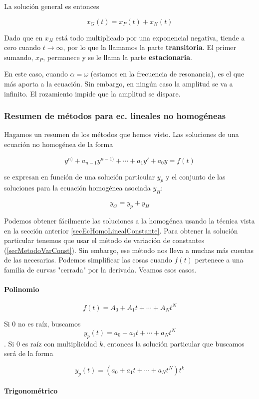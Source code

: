 \documentclass[nochap]{apuntes}
\begin{document}
La solución general es entonces

\[ x_G(t) = x_P(t) + x_H(t) \]

Dado que en $x_H$ está todo multiplicado por una exponencial negativa, tiende a cero cuando $t\to ∞$, por lo que la llamamos la parte \textbf{transitoria}. El primer sumando, $x_P$, permanece y se le llama la parte \textbf{estacionaria}.

En este caso, cuando $α=ω$ (estamos en la frecuencia de resonancia), es el que más aporta a la ecuación. Sin embargo, en ningún caso la amplitud se va a infinito. El rozamiento impide que la amplitud se dispare.

\subsubsection{Resumen de métodos para ec. lineales no homogéneas}

Hagamos un resumen de los métodos que hemos visto. Las soluciones de una ecuación no homogénea de la forma

\[ y^{n)} + a_{n-1}y^{n-1)} + \dotsb + a_1y'+a_0y = f(t) \]

se expresan en función de una solución particular $y_p$ y el conjunto de las soluciones para la ecuación homogénea asociada $y_H$:

\[ y_G = y_p + y_H \]

Podemos obtener fácilmente las soluciones a la homogénea usando la técnica vista en la sección anterior \eqref{secEcHomoLinealConstante}. Para obtener la solución particular tenemos que usar el método de variación de constantes (\ref{secMetodoVarConst}). Sin embargo, ese método nos lleva a muchas más cuentas de las necesarias. Podemos simplificar las cosas cuando $f(t)$ pertenece a una familia de curvas "cerrada" por la derivada. Veamos esos casos.

\paragraph{Polinomio}

\[ f(t) = A_0 + A_1t + \dotsb + A_Nt^N \]

Si $0$ no es raíz, buscamos \[y_p(t) = a_0 + a_1t + \dotsb + a_Nt^N\]. Si $0$ es raíz con multiplicidad $k$, entonces la solución particular que buscamos será de la forma

\[ y_p(t) =( a_0 + a_1t + \dotsb + a_Nt^N)t^k \]

\paragraph{Trigonométrico} 
\end{document}
